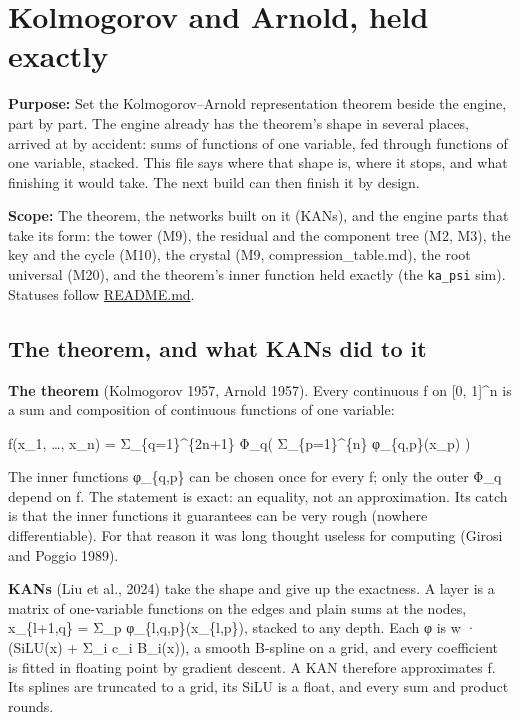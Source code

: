 \chapter{\texorpdfstring{Kolmogorov and Arnold, held exactly}{Kolmogorov and Arnold, held exactly}}
\label{chap:kolmogorov-arnold}

\textbf{Purpose:} Set the Kolmogorov–Arnold representation theorem beside the engine, part by part. The engine already has the theorem's shape in several places, arrived at by accident: sums of functions of one variable, fed through functions of one variable, stacked. This file says where that shape is, where it stops, and what finishing it would take. The next build can then finish it by design.

\textbf{Scope:} The theorem, the networks built on it (KANs), and the engine parts that take its form: the tower (M9), the residual and the component tree (M2, M3), the key and the cycle (M10), the crystal (M9, compression\_\allowbreak{}table.md), the root universal (M20), and the theorem's inner function held exactly (the \texttt{ka\_\allowbreak{}psi} sim). Statuses follow \hyperref[chap:readme]{README.md}.

\section{\texorpdfstring{The theorem, and what KANs did to it}{The theorem, and what KANs did to it}}

\textbf{The theorem} (Kolmogorov 1957, Arnold 1957). Every continuous f on [0, 1]\textasciicircum{}n is a sum and composition of continuous functions of one variable:

f(x\_\allowbreak{}1, …, x\_\allowbreak{}n) = Σ\_\allowbreak{}\{q=1\}\textasciicircum{}\{2n+1\} Φ\_\allowbreak{}q( Σ\_\allowbreak{}\{p=1\}\textasciicircum{}\{n\} φ\_\allowbreak{}\{q,p\}(x\_\allowbreak{}p) )

The inner functions φ\_\allowbreak{}\{q,p\} can be chosen once for every f; only the outer Φ\_\allowbreak{}q depend on f. The statement is exact: an equality, not an approximation. Its catch is that the inner functions it guarantees can be very rough (nowhere differentiable). For that reason it was long thought useless for computing (Girosi and Poggio 1989).

\textbf{KANs} (Liu et al., 2024) take the shape and give up the exactness. A layer is a matrix of one-variable functions on the edges and plain sums at the nodes, x\_\allowbreak{}\{l+1,q\} = Σ\_\allowbreak{}p φ\_\allowbreak{}\{l,q,p\}(x\_\allowbreak{}\{l,p\}), stacked to any depth. Each φ is w · (SiLU(x) + Σ\_\allowbreak{}i c\_\allowbreak{}i B\_\allowbreak{}i(x)), a smooth B-spline on a grid, and every coefficient is fitted in floating point by gradient descent. A KAN therefore approximates f. Its splines are truncated to a grid, its SiLU is a float, and every sum and product rounds.

